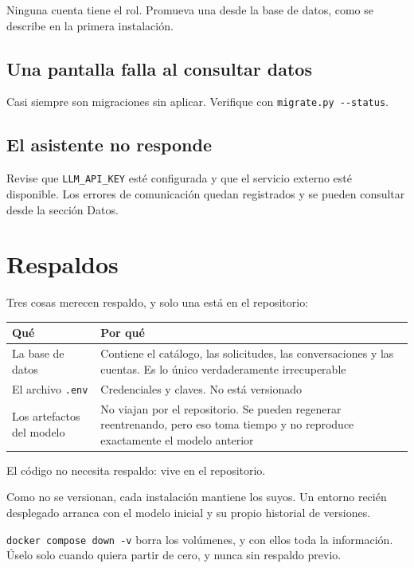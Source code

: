 Ninguna cuenta tiene el rol. Promueva una desde la base de datos, como se
describe en la primera instalación.

\subsection*{Una pantalla falla al consultar datos}

Casi siempre son migraciones sin aplicar. Verifique con
\texttt{migrate.py -{}-status}.

\subsection*{El asistente no responde}

Revise que \texttt{LLM\_API\_KEY} esté configurada y que el servicio externo
esté disponible. Los errores de comunicación quedan registrados y se pueden
consultar desde la sección Datos.

\newpage
\section{Respaldos}

Tres cosas merecen respaldo, y solo una está en el repositorio:

\begin{center}
\begin{tabular}{@{}lp{8.6cm}@{}}
\toprule
\textbf{Qué} & \textbf{Por qué} \\
\midrule
La base de datos & Contiene el catálogo, las solicitudes, las conversaciones y las cuentas. Es lo único verdaderamente irrecuperable \\
El archivo \texttt{.env} & Credenciales y claves. No está versionado \\
Los artefactos del modelo & No viajan por el repositorio. Se pueden regenerar reentrenando, pero eso toma tiempo y no reproduce exactamente el modelo anterior \\
\bottomrule
\end{tabular}
\end{center}

El código no necesita respaldo: vive en el repositorio.

\begin{nota}
Como no se versionan, cada instalación mantiene los suyos. Un entorno recién
desplegado arranca con el modelo inicial y su propio historial de versiones.
\end{nota}

\vspace{1cm}

\begin{aviso}
\texttt{docker compose down -v} borra los volúmenes, y con ellos toda la
información. Úselo solo cuando quiera partir de cero, y nunca sin respaldo
previo.
\end{aviso}


